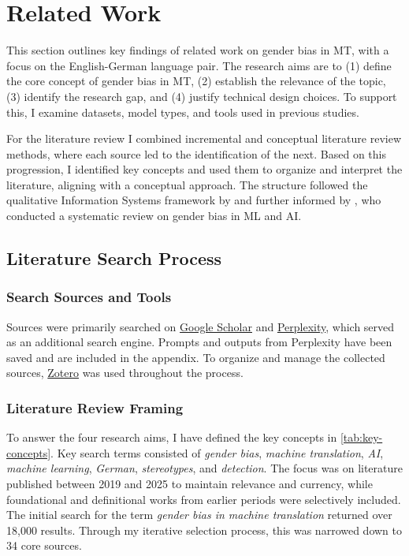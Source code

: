 \chapter{Related Work}

This section outlines key findings of related work on gender bias in MT, with a focus on the English-German language pair. The research aims are to (1) define the core concept of gender bias in MT, (2) establish the relevance of the topic, (3) identify the research gap, and (4) justify technical design choices. To support this, I examine datasets, model types, and tools used in previous studies.

For the literature review I combined incremental and conceptual literature review methods, where each source led to the identification of the next. Based on this progression, I identified key concepts and used them to organize and interpret the literature, aligning with a conceptual approach. The structure followed the qualitative Information Systems framework by \citet{schryenWritingQualitativeLiterature2015} and further informed by \citet{shresthaExploringGenderBiases2022}, who conducted a systematic review on gender bias in ML and AI. 

\section{Literature Search Process}

\subsection{Search Sources and Tools}
Sources were primarily searched on \href{https://scholar.google.com/}{Google Scholar} and \href{https://www.perplexity.ai/}{Perplexity}, which served as an additional search engine. Prompts and outputs from Perplexity have been saved and are included in the appendix. To organize and manage the collected sources, \href{https://www.zotero.org/}{Zotero} was used throughout the process.

\subsection{Literature Review Framing}

To answer the four research aims, I have defined the key concepts in \autoref{tab:key-concepts}. Key search terms consisted of \textit{gender bias}, \textit{machine translation}, \textit{AI}, \textit{machine learning}, \textit{German}, \textit{stereotypes}, and \textit{detection}. The focus was on literature published between 2019 and 2025 to maintain relevance and currency, while foundational and definitional works from earlier periods were selectively included. The initial search for the term \textit{gender bias in machine translation} returned over 18,000 results. Through my iterative selection process, this was narrowed down to 34 core sources.

